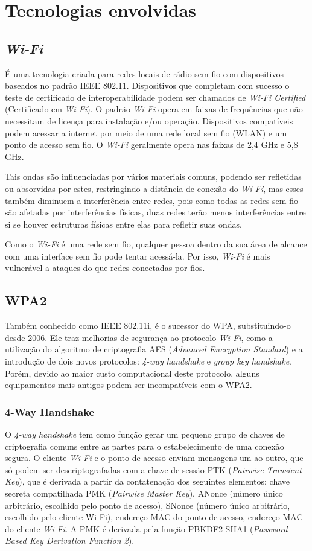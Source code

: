 \documentclass[12pt]{article}
\begin{document}
\section{Tecnologias envolvidas}
\subsection{\textit{Wi-Fi}}
É uma tecnologia criada para redes locais de rádio sem fio com dispositivos baseados no padrão IEEE 802.11. Dispositivos que completam com sucesso o teste de certificado de interoperabilidade podem ser chamados de \textit{Wi-Fi Certified} (Certificado em \textit{Wi-Fi}). O padrão \textit{Wi-Fi} opera em faixas de frequências que não necessitam de licença para instalação e/ou operação. Dispositivos compatíveis podem acessar a internet por meio de uma rede local sem fio (WLAN) e um ponto de acesso sem fio. O \textit{Wi-Fi} geralmente opera nas faixas de 2,4 GHz e 5,8 GHz.

Tais ondas são influenciadas por vários materiais comuns, podendo ser refletidas ou absorvidas por estes, restringindo a distância de conexão do \textit{Wi-Fi}, mas esses também diminuem a interferência entre redes, pois como todas as redes sem fio são afetadas por interferências físicas, duas redes terão menos interferências entre si se houver estruturas físicas entre elas para refletir suas ondas.

Como o \textit{Wi-Fi} é uma rede sem fio, qualquer pessoa dentro da sua área de alcance com uma interface sem fio pode tentar acessá-la. Por isso, \textit{Wi-Fi} é mais vulnerável a ataques do que redes conectadas por fios.

\subsection{WPA2}
Também conhecido como IEEE 802.11i, é o sucessor do WPA, substituindo-o desde 2006. Ele traz melhorias de segurança ao protocolo \textit{Wi-Fi}, como a utilização do algoritmo de criptografia AES (\textit{Advanced Encryption Standard}) e a introdução de dois novos protocolos: \textit{4-way handshake} e \textit{group key handshake}. Porém, devido ao maior custo computacional deste protocolo, alguns equipamentos mais antigos podem ser incompatíveis com o WPA2.

\subsubsection{4-Way Handshake}
O \textit{4-way handshake} tem como função gerar um pequeno grupo de chaves de criptografia comuns entre as partes para o estabelecimento de uma conexão segura. O cliente \textit{Wi-Fi} e o ponto de acesso enviam mensagens um ao outro, que só podem ser descriptografadas com a chave de sessão PTK (\textit{Pairwise Transient Key}), que é derivada a partir da contatenação dos seguintes elementos: chave secreta compatilhada PMK (\textit{Pairwise Master Key}), ANonce (número único arbitrário, escolhido pelo ponto de acesso), SNonce (número único arbitrário, escolhido pelo cliente Wi-Fi), endereço MAC do ponto de acesso, endereço MAC do cliente \textit{Wi-Fi}. A PMK é derivada pela função PBKDF2-SHA1 (\textit{Password-Based Key Derivation Function 2}).
\end{document}
